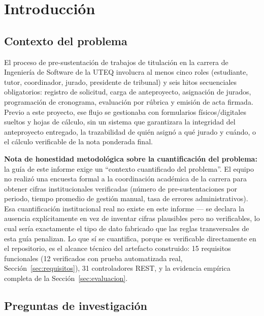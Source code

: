 \section{Introducción}
\label{sec:introduccion}

\subsection{Contexto del problema}

El proceso de pre-sustentación de trabajos de titulación en la carrera de Ingeniería de Software de la
UTEQ involucra al menos cinco roles (estudiante, tutor, coordinador, jurado, presidente de tribunal) y
seis hitos secuenciales obligatorios: registro de solicitud, carga de anteproyecto, asignación de
jurados, programación de cronograma, evaluación por rúbrica y emisión de acta firmada. Previo a este
proyecto, ese flujo se gestionaba con formularios físicos/digitales sueltos y hojas de cálculo, sin un
sistema que garantizara la integridad del anteproyecto entregado, la trazabilidad de quién asignó a qué
jurado y cuándo, o el cálculo verificable de la nota ponderada final.

\textbf{Nota de honestidad metodológica sobre la cuantificación del problema:} la guía de este informe
exige un ``contexto cuantificado del problema''. El equipo no realizó una encuesta formal a la
coordinación académica de la carrera para obtener cifras institucionales verificadas (número de
pre-sustentaciones por periodo, tiempo promedio de gestión manual, tasa de errores administrativos). Esa
cuantificación institucional real no existe en este informe --- se declara la ausencia explícitamente en
vez de inventar cifras plausibles pero no verificables, lo cual sería exactamente el tipo de dato
fabricado que las reglas transversales de esta guía penalizan. Lo que sí se cuantifica, porque es
verificable directamente en el repositorio, es el alcance técnico del artefacto construido: 15
requisitos funcionales (12 verificados con prueba automatizada real, Sección~\ref{sec:requisitos}), 31
controladores REST, y la evidencia empírica completa de la Sección~\ref{sec:evaluacion}.

\subsection{Preguntas de investigación}

